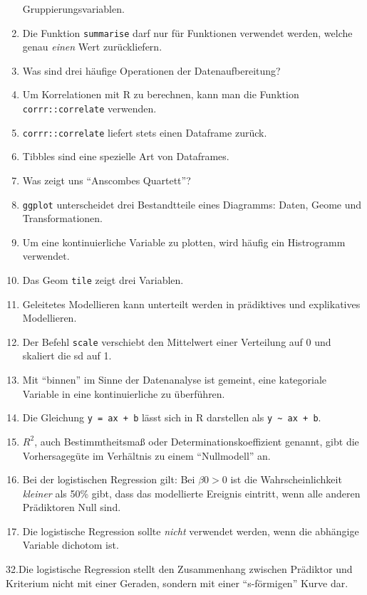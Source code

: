 \documentclass[12pt,ngerman,]{book}
\begin{document}
\begin{enumerate}
  Gruppierungsvariablen.
\item
  Die Funktion \texttt{summarise} darf nur für Funktionen verwendet
  werden, welche genau \emph{einen} Wert zurückliefern.
\item
  Was sind drei häufige Operationen der Datenaufbereitung?
\item
  Um Korrelationen mit R zu berechnen, kann man die Funktion
  \texttt{corrr::correlate} verwenden.
\item
  \texttt{corrr::correlate} liefert stets einen Dataframe zurück.
\item
  Tibbles sind eine spezielle Art von Dataframes.
\item
  Was zeigt uns ``Anscombes Quartett''?
\item
  \texttt{ggplot} unterscheidet drei Bestandtteile eines Diagramms:
  Daten, Geome und Transformationen.
\item
  Um eine kontinuierliche Variable zu plotten, wird häufig ein
  Histrogramm verwendet.
\item
  Das Geom \texttt{tile} zeigt drei Variablen.
\item
  Geleitetes Modellieren kann unterteilt werden in prädiktives und
  explikatives Modellieren.
\item
  Der Befehl \texttt{scale} verschiebt den Mittelwert einer Verteilung
  auf 0 und skaliert die sd auf 1.
\item
  Mit ``binnen'' im Sinne der Datenanalyse ist gemeint, eine kategoriale
  Variable in eine kontinuierliche zu überführen.
\item
  Die Gleichung \texttt{y\ =\ ax\ +\ b} lässt sich in R darstellen als
  \texttt{y\ \textasciitilde{}\ ax\ +\ b}.
\item
  \(R^2\), auch Bestimmtheitsmaß oder Determinationskoeffizient genannt,
  gibt die Vorhersagegüte im Verhältnis zu einem ``Nullmodell'' an.
\item
  Bei der logistischen Regression gilt: Bei \(β0>0\) ist die
  Wahrscheinlichkeit \emph{kleiner} als 50\% gibt, dass das modellierte
  Ereignis eintritt, wenn alle anderen Prädiktoren Null sind.
\item
  Die logistische Regression sollte \emph{nicht} verwendet werden, wenn
  die abhängige Variable dichotom ist.
\end{enumerate}

32.Die logistische Regression stellt den Zusammenhang zwischen Prädiktor
und Kriterium nicht mit einer Geraden, sondern mit einer ``s-förmigen''
Kurve dar.
\end{document}
